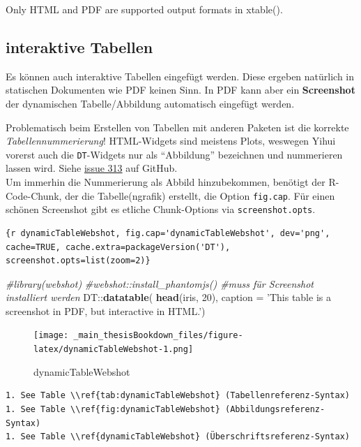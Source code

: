 \documentclass[]{book}
\makeatletter
\newenvironment{Shaded}{\begin{snugshade}}{\end{snugshade}}
\newcommand{\KeywordTok}[1]{\textcolor[rgb]{0.13,0.29,0.53}{\textbf{{#1}}}}
\newcommand{\DataTypeTok}[1]{\textcolor[rgb]{0.13,0.29,0.53}{{#1}}}
\newcommand{\DecValTok}[1]{\textcolor[rgb]{0.00,0.00,0.81}{{#1}}}
\newcommand{\StringTok}[1]{\textcolor[rgb]{0.31,0.60,0.02}{{#1}}}
\newcommand{\CommentTok}[1]{\textcolor[rgb]{0.56,0.35,0.01}{\textit{{#1}}}}
\newcommand{\NormalTok}[1]{{#1}}
\newenvironment{kframe}{%
\medskip{}
\setlength{\fboxsep}{.8em}
 \def\at@end@of@kframe{}%
 \ifinner\ifhmode%
  \def\at@end@of@kframe{\end{minipage}}%
  \begin{minipage}{\columnwidth}%
 \fi\fi%
 \def\FrameCommand##1{\hskip\@totalleftmargin \hskip-\fboxsep
 \colorbox{shadecolor}{##1}\hskip-\fboxsep
     \hskip-\linewidth \hskip-\@totalleftmargin \hskip\columnwidth}%
 \MakeFramed {\advance\hsize-\width
   \@totalleftmargin\z@ \linewidth\hsize
   \@setminipage}}%
 {\par\unskip\endMakeFramed%
 \at@end@of@kframe}
\renewenvironment{Shaded}{\begin{kframe}}{\end{kframe}}
\theoremstyle{definition}
\theoremstyle{definition}
\theoremstyle{remark}
\let\BeginKnitrBlock\begin \let\EndKnitrBlock\end
\makeatother
\begin{document}
\BeginKnitrBlock{rmdcaution}
Only HTML and PDF are supported output formats in xtable().
\EndKnitrBlock{rmdcaution}

\subsection{interaktive Tabellen}\label{interactiveTable}

Es können auch interaktive Tabellen eingefügt werden. Diese ergeben
natürlich in statischen Dokumenten wie PDF keinen Sinn. In PDF kann aber
ein \textbf{Screenshot} der dynamischen Tabelle/Abbildung automatisch
eingefügt werden.

Problematisch beim Erstellen von Tabellen mit anderen Paketen ist die
korrekte \emph{Tabellennummerierung}! HTML-Widgets sind meistens Plots,
weswegen Yihui vorerst auch die \texttt{DT}-Widgets nur als
``Abbildung'' bezeichnen und nummerieren lassen wird. Siehe
\href{https://github.com/rstudio/bookdown/issues/313}{issue 313} auf
GitHub.\\
Um immerhin die Nummerierung als Abbild hinzubekommen, benötigt der
R-Code-Chunk, der die Tabelle(ngrafik) erstellt, die Option
\texttt{fig.cap}. Für einen schönen Screenshot gibt es etliche
Chunk-Options via \texttt{screenshot.opts}.

\begin{verbatim}
{r dynamicTableWebshot, fig.cap='dynamicTableWebshot', dev='png', cache=TRUE, cache.extra=packageVersion('DT'), screenshot.opts=list(zoom=2)}
\end{verbatim}

\begin{Shaded}
\begin{Highlighting}[]
  \CommentTok{#library(webshot)}
  \CommentTok{#webshot::install_phantomjs()  #muss für Screenshot installiert werden}
  \NormalTok{DT::}\KeywordTok{datatable}\NormalTok{(}
    \KeywordTok{head}\NormalTok{(iris, }\DecValTok{20}\NormalTok{), }\DataTypeTok{caption =} \StringTok{'This table is a screenshot in PDF, but interactive in HTML.'}\NormalTok{)}
\end{Highlighting}
\end{Shaded}

\begin{figure}[htbp]
\centering
\texttt{[image: \_main\_thesisBookdown\_files/figure-latex/dynamicTableWebshot-1.png]}
\caption{\label{fig:dynamicTableWebshot}dynamicTableWebshot}
\end{figure}

\begin{verbatim}
1. See Table \\ref{tab:dynamicTableWebshot} (Tabellenreferenz-Syntax)
1. See Table \\ref{fig:dynamicTableWebshot} (Abbildungsreferenz-Syntax)
1. See Table \\ref{dynamicTableWebshot} (Überschriftsreferenz-Syntax)
\end{verbatim}
\end{document}
